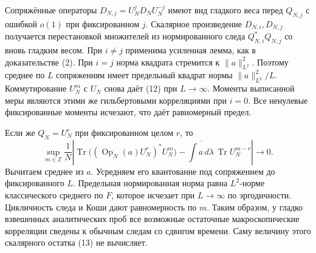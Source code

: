\documentclass[11pt,a4paper]{article}
\newcommand{\Tr}{\operatorname{Tr}}
\newcommand{\Z}{\mathbb Z}
\begin{document}
Сопряжённые операторы $D_{N,j}=U_N^jD_NU_N^{-j}$ имеют вид гладкого веса перед $Q_{N,j}$ с ошибкой $o(1)$ при фиксированном $j$. Скалярное произведение $D_{N,i},D_{N,j}$ получается перестановкой множителей из нормированного следа $Q_{N,i}^*Q_{N,j}$ со вновь гладким весом. При $i\ne j$ применима усиленная лемма, как в доказательстве (2). При $i=j$ норма квадрата стремится к $\|a\|_{L^2}^2$. Поэтому среднее по $L$ сопряжениям имеет предельный квадрат нормы $\|a\|_{L^2}^2/L$. Коммутирование $U_N^m$ с $U_N$ снова даёт (12) при $L\to\infty$. Моменты выписанной меры являются этими же гильбертовыми корреляциями при $i=0$. Все ненулевые фиксированные моменты исчезают, что даёт равномерный предел.

Если же $Q_N=U_N^r$ при фиксированном целом $r$, то
\[
 \sup_{m\in\Z}\frac1N\left|
    \Tr\big((\operatorname{Op}_N(a)U_N^r)^*U_N^m\big)
           -\overline{\int a\,d\lambda}\,\Tr U_N^{m-r}\right|\to0.  \tag{13}
\]
Вычитаем среднее из $a$. Усредняем его квантование под сопряжением до фиксированного $L$. Предельная нормированная норма равна $L^2$-норме классического среднего по $F$, которое исчезает при $L\to\infty$ по эргодичности. Цикличность следа и Коши дают равномерность по $m$. Таким образом, у гладко взвешенных аналитических проб все возможные остаточные макроскопические корреляции сведены к обычным следам со сдвигом времени. Саму величину этого скалярного остатка (13) не вычисляет.
\end{document}
